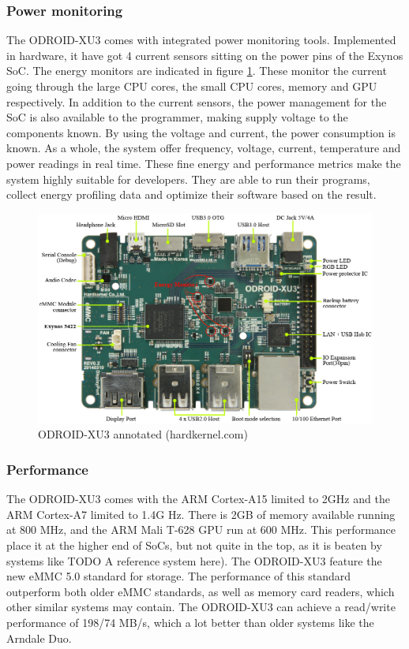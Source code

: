 \subsubsection{Power monitoring}
The ODROID-XU3 comes with integrated power monitoring tools.
Implemented in hardware, it have got 4 current sensors sitting on the power pins of the Exynos SoC.
The energy monitors are indicated in figure \ref{overview-odroid}.
These monitor the current going through the large CPU cores, the small CPU cores, memory and GPU respectively.
In addition to the current sensors, the power management for the SoC is also available to the programmer, making supply voltage to the components known.
By using the voltage and current, the power consumption is known.
As a whole, the system offer frequency, voltage, current, temperature and power readings in real time.
These fine energy and performance metrics make the system highly suitable for developers.
They are able to run their programs, collect energy profiling data and optimize their software based on the result.

\begin{figure}[ht!]
  \centering
  \includegraphics[width=130mm]{fig/overview-odroid.jpg}
  \caption{ODROID-XU3 annotated (hardkernel.com\cite{hardkernel01})\label{overview-odroid}}
\end{figure}

\subsubsection{Performance}

The ODROID-XU3 comes with the ARM Cortex-A15 limited to 2GHz and the ARM Cortex-A7 limited to 1.4G Hz.
There is 2GB of memory available running at 800 MHz, and the ARM Mali T-628 GPU run at 600 MHz.
This performance place it at the higher end of SoCs, but not quite in the top, as it is beaten by systems like TODO A reference system here).
The ODROID-XU3 feature the new eMMC 5.0 standard for storage.
The performance of this standard outperform both older eMMC standards, as well as memory card readers, which other similar systems may contain.
The ODROID-XU3 can achieve a read/write performance of 198/74 MB/s\cite{hardkernel01}, which a lot better than older systems like the Arndale Duo.

